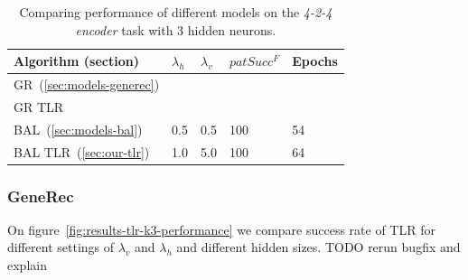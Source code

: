 \begin{table}[H] 
  \centering
    \begin{tabular}{|l|l|l|l|l|}
    \hline
    Algorithm (section)&$\lambda_h$&$\lambda_v$&$patSucc^F$ &Epochs\\ %
    \hline
    GR~(\ref{sec:models-generec}) & & & & \\ %
    \hline
    GR TLR & & & & \\ %
    \hline
    BAL~(\ref{sec:models-bal})&0.5& 0.5&100& 54\\ %
    \hline
    BAL TLR~(\ref{sec:our-tlr})&1.0& 5.0 & 100& 64\\ %
    \hline 
    \end{tabular}
  \caption{Comparing performance of different models on the \emph{4-2-4 encoder} task with 3 hidden neurons. } 
  \label{tab:results-cmp-k3}
\end{table}






\subsubsection{GeneRec} 

On figure~\ref{fig:results-tlr-k3-performance} we compare success rate of TLR for different settings of $\lambda_v$ and $\lambda_h$ and different hidden sizes. TODO rerun bugfix and explain 

